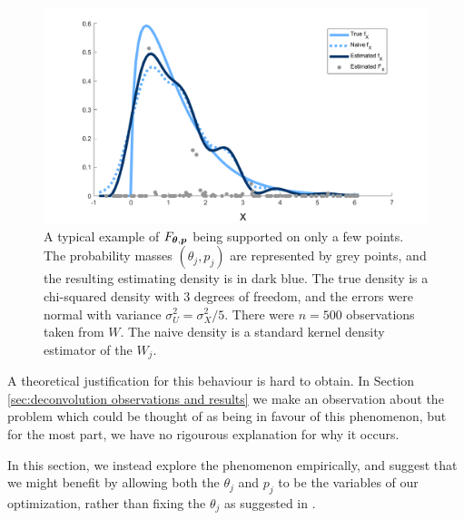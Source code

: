 	\begin{figure}
		\centering
		\includegraphics[width = \textwidth]{Figures/Deconvolution/fixed_masses_example.png}
		\caption[A typical example of $F_{\vect{\theta}, \vect{p}}$ being supported on only a few points]{A typical example of $F_{\vect{\theta}, \vect{p}}$ being supported on only a few points. The probability masses $(\theta_j, p_j)$ are represented by grey points, and the resulting estimating density is in dark blue. The true density is a chi-squared density with 3 degrees of freedom, and the errors were normal with variance $\sigma_U^2 = \sigma_X^2 / 5$. There were $n = 500$ observations taken from $W$. The naive density is a standard kernel density estimator of the $W_j$.}
		\label{fig:fixed masses example alone}
	\end{figure}


	A theoretical justification for this behaviour is hard to obtain. In Section \ref{sec:deconvolution observations and results} we make an observation about the problem which could be thought of as being in favour of this phenomenon, but for the most part, we have no rigourous explanation for why it occurs.

	In this section, we instead explore the phenomenon empirically, and suggest that we might benefit by allowing both the $\theta_j$ and $p_j$ to be the variables of our optimization, rather than fixing the $\theta_j$ as suggested in \cite{Delaigle2016-la}.

